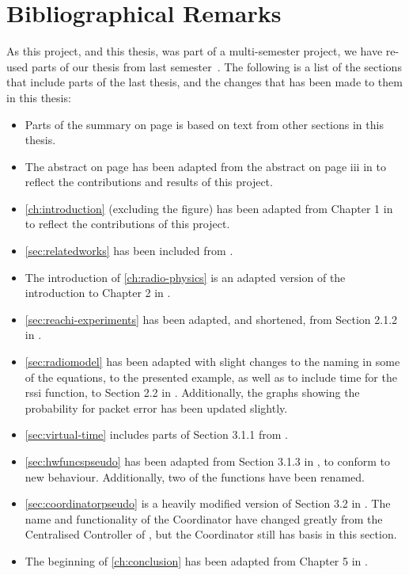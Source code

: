\chapter{Bibliographical Remarks}
As this project, and this thesis, was part of a multi-semester project, we have re-used parts of
our thesis from last semester~\cite{paper:massivesims1}. The following is a list of the sections that include
parts of the last thesis, and the changes that has been made to them in this thesis:

\begin{itemize}
    \item Parts of the summary on page \pageref{ch:summary} is based on text from other sections in this
          thesis.
    \item The abstract on page \pageref{page:titlepage} has been adapted from the abstract on page iii in
          \cite{paper:massivesims1} to reflect the contributions and results of this project.
    \item \autoref{ch:introduction} (excluding the figure) has been adapted from Chapter 1 in
          \cite{paper:massivesims1} to reflect the contributions of this project.
    \item \autoref{sec:relatedworks} has been included from \cite{paper:massivesims1}.
    \item The introduction of \autoref{ch:radio-physics} is an adapted version of the introduction to Chapter
          2 in \cite{paper:massivesims1}.
    \item \autoref{sec:reachi-experiments} has been adapted, and shortened, from Section 2.1.2 in
          \cite{paper:massivesims1}.
    \item \autoref{sec:radiomodel} has been adapted with slight changes to the naming in some of the
          equations, to the presented example, as well as to include time for the \gls{rssi} function, to
          Section 2.2 in \cite{paper:massivesims1}. Additionally, the graphs showing the probability for packet
          error has been updated slightly.
    \item \autoref{sec:virtual-time} includes parts of Section 3.1.1 from \cite{paper:massivesims1}.
    \item \autoref{sec:hwfuncspseudo} has been adapted from Section 3.1.3 in \cite{paper:massivesims1}, to
          conform to new behaviour. Additionally, two of the functions have been renamed.
    \item \autoref{sec:coordinatorpseudo} is a heavily modified version of Section 3.2 in
          \cite{paper:massivesims1}. The name and functionality of the Coordinator have changed greatly from
          the Centralised Controller of \cite{paper:massivesims1}, but the Coordinator still has basis in this
          section.
    \item The beginning of \autoref{ch:conclusion} has been adapted from Chapter 5 in
          \cite{paper:massivesims1}.
\end{itemize}